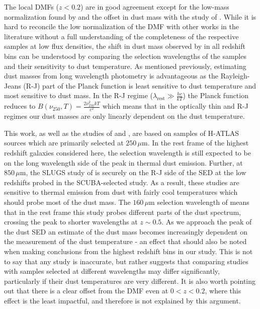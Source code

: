 The local DMFs ($z < 0.2$) are in good agreement except for the low-mass normalization found by \citealt{Dunne_2011} and the offset in dust mass with the study of \citealt{Pozzi_2020}. While it is hard to reconcile the low normalization of the \citealt{Dunne_2011} DMF with other works in the literature without a full understanding of the completeness of the respective samples at low flux densities, the shift in dust mass observed by \citealt{Pozzi_2020} in all redshift bins can be understood by comparing the selection wavelengths of the samples and their sensitivity to dust temperature. As mentioned previously, estimating dust masses from long wavelength photometry is advantageous as the Rayleigh-Jeans (R-J) part of the Planck function is least sensitive to dust temperature and most sensitive to dust mass. In the R-J regime ($\lambda_{\textrm{rest}} \gg \frac{hc}{kT}$) the Planck function reduces to $B(\nu_{250}, T) = \frac{2\nu_{250}^{2}kT}{c^2}$ which means that in the optically thin and R-J regimes our dust masses are only linearly dependent on the dust temperature.

This work, as well as the studies of \citet{Dunne_2011} and \citealt{Beeston_2018}, are based on samples of H-ATLAS sources which are primarily selected at $250\,\mu$m. In the rest frame of the highest redshift galaxies considered here, the selection wavelength is still expected to be on the long wavelength side of the peak in thermal dust emission. Further, at $850\,\mu$m, the SLUGS study of \citealt{Vlahakis_2005} is securely on the R-J side of the SED at the low redshifts probed in the SCUBA-selected study. As a result, these studies are sensitive to thermal emission from dust with fairly cool temperatures which should probe most of the dust mass. The $160\,\mu$m selection wavelength of \citealt{Pozzi_2020} means that in the rest frame this study probes different parts of the dust spectrum, crossing the peak to shorter wavelengths at $z \sim 0.5$. As we approach the peak of the dust SED an estimate of the dust mass becomes increasingly dependent on the measurement of the dust temperature - an effect that should also be noted when making conclusions from the highest redshift bins in our study. This is not to say that any study is inaccurate, but rather suggests that comparing studies with samples selected at different wavelengths may differ significantly, particularly if their dust temperatures are very different. It is also worth pointing out that there is a clear offset from the \citealt{Pozzi_2020} DMF even at $0 < z < 0.2$, where this effect is the least impactful, and therefore is not explained by this argument.

